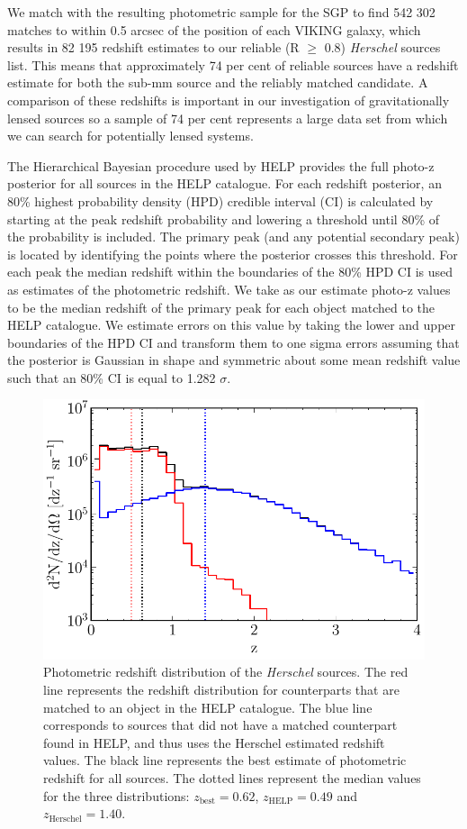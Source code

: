 \documentclass[fleqn,usenatbib]{mnras}
\begin{document}
We match with the resulting photometric sample for the SGP to find 542 302 matches to within 0.5 arcsec of the position of each VIKING galaxy, which results in 82 195 redshift estimates to our reliable (R $\geq$ 0.8) \textit{Herschel} sources list. This means that approximately 74 per cent of reliable sources have a redshift estimate for both the sub-mm source and the reliably matched candidate. A comparison of these redshifts is important in our investigation of gravitationally lensed sources so a sample of 74 per cent represents a large data set from which we can search for potentially lensed systems.

The Hierarchical Bayesian procedure used by HELP provides the full photo-z posterior for all sources in the HELP catalogue. For each redshift posterior, an 80\% highest probability density (HPD) credible interval (CI) is calculated by starting at the peak redshift probability and lowering a threshold until 80\% of the probability is included. The primary peak (and any potential secondary peak) is located by identifying the points where the posterior crosses this threshold. For each peak the median redshift within the boundaries of the 80\% HPD CI is used as estimates of the photometric redshift. We take as our estimate photo-z values to be the median redshift of the primary peak for each object matched to the HELP catalogue. We estimate errors on this value by taking the lower and upper boundaries of the HPD CI and transform them to one sigma errors assuming that the posterior is Gaussian in shape and symmetric about some mean redshift value such that an 80\% CI is equal to 1.282 $\sigma$.

\begin{figure}
	\includegraphics[width=\columnwidth]{Fig_7}
	\caption{Photometric redshift distribution of the \textit{Herschel} sources. The red line represents the redshift distribution for counterparts that are matched to an object in the HELP catalogue. The blue line corresponds to sources that did not have a matched counterpart found in HELP, and thus uses the Herschel estimated redshift values. The black line represents the best estimate of photometric redshift for all sources. The dotted lines represent the median values for the three distributions: $z_{\textrm{best}} = 0.62$, $z_{\textrm{HELP}} = 0.49$ and $z_{\textrm{Herschel}} = 1.40$.} 
	\label{fig:z_distribution}
\end{figure}
\end{document}
